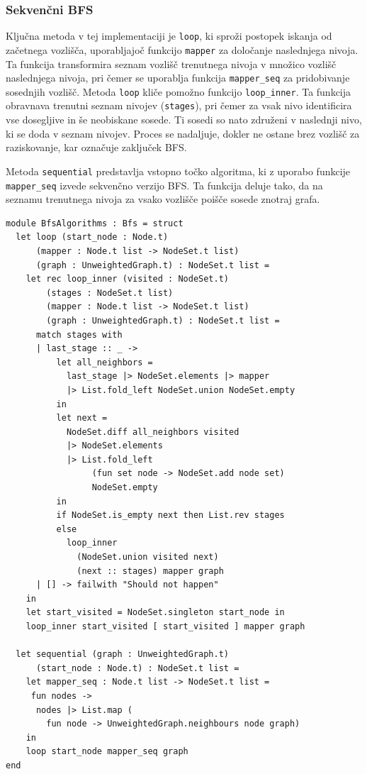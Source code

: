 \documentclass[mat1, tisk]{fmfdelo}
\begin{document}
\subsubsection{Sekvenčni BFS}

Ključna metoda v tej implementaciji je \texttt{loop}, ki sproži postopek iskanja od začetnega vozlišča, uporabljajoč funkcijo
\texttt{mapper} za določanje naslednjega nivoja. Ta funkcija transformira seznam vozlišč trenutnega nivoja v množico
vozlišč naslednjega nivoja, pri čemer se uporablja funkcija \texttt{mapper\_seq} za pridobivanje sosednjih vozlišč.
Metoda \texttt{loop} kliče pomožno funkcijo \texttt{loop\_inner}. Ta funkcija obravnava trenutni seznam
nivojev (\texttt{stages}), pri čemer za vsak nivo identificira vse dosegljive in še neobiskane sosede.
Ti sosedi so nato združeni v naslednji nivo, ki se doda v seznam nivojev. Proces se nadaljuje, dokler ne ostane brez
vozlišč za raziskovanje, kar označuje zaključek BFS.

Metoda \texttt{sequential} predstavlja vstopno točko algoritma, ki z uporabo funkcije \texttt{mapper\_seq} izvede
sekvenčno verzijo BFS. Ta funkcija deluje tako, da na seznamu trenutnega nivoja za vsako vozlišče poišče sosede znotraj grafa.

\begin{lstlisting}[label=lst:bfs_sequential]
module BfsAlgorithms : Bfs = struct
  let loop (start_node : Node.t)
      (mapper : Node.t list -> NodeSet.t list)
      (graph : UnweightedGraph.t) : NodeSet.t list =
    let rec loop_inner (visited : NodeSet.t) 
        (stages : NodeSet.t list)
        (mapper : Node.t list -> NodeSet.t list) 
        (graph : UnweightedGraph.t) : NodeSet.t list =
      match stages with
      | last_stage :: _ ->
          let all_neighbors =
            last_stage |> NodeSet.elements |> mapper
            |> List.fold_left NodeSet.union NodeSet.empty
          in
          let next =
            NodeSet.diff all_neighbors visited
            |> NodeSet.elements
            |> List.fold_left
                 (fun set node -> NodeSet.add node set)
                 NodeSet.empty
          in
          if NodeSet.is_empty next then List.rev stages
          else
            loop_inner
              (NodeSet.union visited next)
              (next :: stages) mapper graph
      | [] -> failwith "Should not happen"
    in
    let start_visited = NodeSet.singleton start_node in
    loop_inner start_visited [ start_visited ] mapper graph

  let sequential (graph : UnweightedGraph.t) 
      (start_node : Node.t) : NodeSet.t list =
    let mapper_seq : Node.t list -> NodeSet.t list =
     fun nodes ->
      nodes |> List.map (
        fun node -> UnweightedGraph.neighbours node graph)
    in
    loop start_node mapper_seq graph
end
\end{lstlisting}
\end{document}
